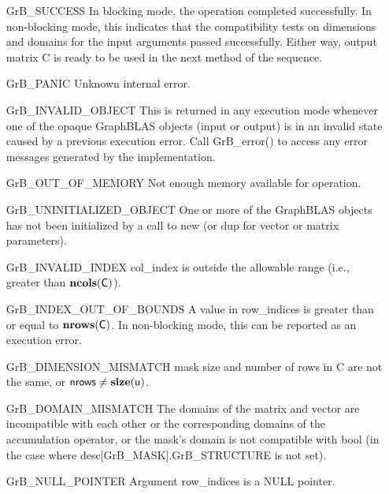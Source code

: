 \begin{itemize}[leftmargin=2.3in]
    \item[{\sf GrB\_SUCCESS}]         In blocking mode, the operation completed
    successfully. In non-blocking mode, this indicates that the compatibility 
    tests on dimensions and domains for the input arguments passed successfully. 
    Either way, output matrix {\sf C} is ready to be used in the next method of 
    the sequence.

    \item[{\sf GrB\_PANIC}]           Unknown internal error.

    \item[{\sf GrB\_INVALID\_OBJECT}] This is returned in any execution mode 
    whenever one of the opaque GraphBLAS objects (input or output) is in an invalid 
    state caused by a previous execution error.  Call {\sf GrB\_error()} to access 
    any error messages generated by the implementation.

    \item[{\sf GrB\_OUT\_OF\_MEMORY}] Not enough memory available for operation.

    \item[{\sf GrB\_UNINITIALIZED\_OBJECT}] One or more of the GraphBLAS objects
    has not been initialized by a call to {\sf new} (or {\sf dup} for vector or
    matrix parameters).

    \item[{\sf GrB\_INVALID\_INDEX}]    {\sf col\_index} is outside the allowable 
    range (i.e., greater than $\bold{ncols}({\sf C})$).

    \item[{\sf GrB\_INDEX\_OUT\_OF\_BOUNDS}]  A value in {\sf row\_indices}
    is greater than or equal to $\bold{nrows}({\sf C})$.  In 
    non-blocking mode, this can be reported as an execution error.

    \item[{\sf GrB\_DIMENSION\_MISMATCH}] {\sf mask} size and number of rows
    in {\sf C} are not the same, or ${\sf nrows} \neq \bold{size}({\sf u})$.

    \item[{\sf GrB\_DOMAIN\_MISMATCH}]    The domains of the matrix and vector are
    incompatible with each other or the corresponding domains of the
    accumulation operator, or the mask's domain is not compatible with {\sf bool}
    (in the case where {\sf desc[GrB\_MASK].GrB\_STRUCTURE} is not set).

    \item[{\sf GrB\_NULL\_POINTER}] Argument {\sf row\_indices} is a {\sf NULL} pointer.
\end{itemize}

